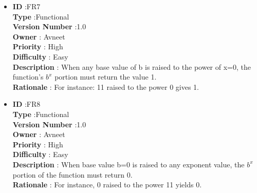\documentclass[a4paper,12pt]{report}
\begin{document}
\begin{itemize}
	\item
    \textbf{ID } \hspace{3cm} :FR7  \\
	\textbf{Type } \hspace{2.4cm}  :Functional\\
	\textbf{Version Number} \hspace{0.3cm} :1.0  \\
	\textbf{Owner } \hspace{1.98cm} : Avneet \\
	\textbf{Priority } \hspace{1.75cm} : High\\
	\textbf{Difficulty } \hspace{1.5cm} : Easy\\
	\textbf{Description }\hspace{1.2cm} : When any base value of b is raised to the power of x=0, the function's $b^x$ portion must return the value 1.\\
	\textbf{Rationale }\hspace{1.6cm} : For instance: 11 raised to the power 0 gives 1.\\

	\item
    \textbf{ID } \hspace{3cm} :FR8  \\
	\textbf{Type } \hspace{2.4cm}  :Functional\\
	\textbf{Version Number} \hspace{0.3cm} :1.0  \\
	\textbf{Owner } \hspace{1.98cm} : Avneet \\
	\textbf{Priority } \hspace{1.75cm} : High\\
	\textbf{Difficulty } \hspace{1.5cm} : Easy\\
	\textbf{Description }\hspace{1.2cm} : When base value b=0 is raised to any exponent value, the $b^x$ portion of the function must return 0.\\
	\textbf{Rationale }\hspace{1.6cm} : For instance, 0 raised to the power 11 yields 0.\\

\end{itemize}
\end{document}
